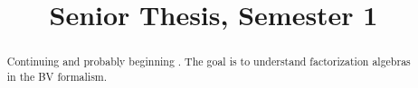\documentclass[11pt, letterpaper]{report}
\title{Senior Thesis, Semester 1}
\begin{document}
    \maketitle
    \tableofcontents

    \begin{abstract}
	    Continuing \cite{costello-gwilliam-1} and probably beginning \cite{costello-gwilliam-2}. The goal is to understand factorization algebras in the BV formalism.
    \end{abstract}
    
    
    
    
    
\end{document}

